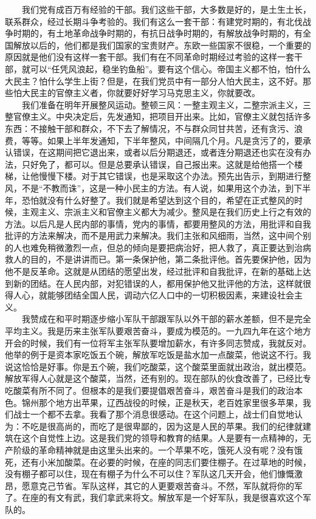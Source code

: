\documentclass[cn,11pt,chinese]{elegantbook}
\begin{document}
　　我们党有成百万有经验的干部。我们这些干部，大多数是好的，是土生土长，联系群众，经过长期斗争考验的。我们有这么一套干部：有建党时期的，有北伐战争时期的，有土地革命战争时期的，有抗日战争时期的，有解放战争时期的，有全国解放以后的，他们都是我们国家的宝贵财产。东欧一些国家不很稳，一个重要的原因就是他们没有这样一套干部。我们有在不同革命时期经过考验的这样一套干部，就可以“任凭风浪起，稳坐钓鱼船”。要有这个信心。帝国主义都不怕，怕什么大民主？怕什么学生上街？但是，在我们党员中有一部分人怕大民主，这不好。那些怕大民主的官僚主义者，你就要好好学习马克思主义，你就要改。\\
　　我们准备在明年开展整风运动。整顿三风：一整主观主义，二整宗派主义，三整官僚主义。中央决定后，先发通知，把项目开出来。比如，官僚主义就包括许多东西：不接触干部和群众，不下去了解情况，不与群众同甘共苦，还有贪污、浪费，等等。如果上半年发通知，下半年整风，中间隔几个月。凡是贪污了的，要承认错误，在这期间把它退出来，或者以后分期退还，或者连分期退还也实在没有办法，只好免了，都可以。但是总要承认错误，自己报出来。这就是给他搭一个楼梯，让他慢慢下楼。对于其它错误，也是采取这个办法。预先出告示，到期进行整风，不是“不教而诛”，这是一种小民主的方法。有人说，如果用这个办法，到下半年，恐怕就没有什么好整了。我们就是希望达到这个目的，希望在正式整风的时候，主观主义、宗派主义和官僚主义都大为减少。整风是在我们历史上行之有效的方法。以后凡是人民内部的事情，党内的事情，都要用整风的方法，用批评和自我批评的方法来解决，而不是用武力来解决。我们主张和风细雨，当然，这中间个别的人也难免稍微激烈一点，但总的倾向是要把病治好，把人救了，真正要达到治病救人的目的，不是讲讲而已。第一条保护他，第二条批评他。首先要保护他，因为他不是反革命。这就是从团结的愿望出发，经过批评和自我批评，在新的基础上达到新的团结。在人民内部，对犯错误的人，都用保护他又批评他的方法，这样就很得人心，就能够团结全国人民，调动六亿人口中的一切积极因素，来建设社会主义。\\
　　我赞成在和平时期逐步缩小军队干部跟军队以外干部的薪水差额，但不是完全平均主义。我是历来主张军队要艰苦奋斗，要成为模范的。一九四九年在这个地方开会的时候，我们有一位将军主张军队要增加薪水，有许多同志赞成，我就反对。他举的例于是资本家吃饭五个碗，解放军吃饭是盐水加一点酸菜，他说这不行。我说这恰恰是好事。你是五个碗，我们吃酸菜，这个酸菜里面就出政治，就出模范。解放军得人心就是这个酸菜，当然，还有别的。现在部队的伙食改善了，已经比专吃酸菜有所不同了。但根本的是我们要提倡艰苦奋斗，艰苦奋斗是我们的政治本色。锦州那个地方出苹果，辽西战役的时候，正是秋天，老百姓家里很多苹果，我们战士一个都不去拿。我看了那个消息很感动。在这个问题上，战士们自觉地认为：不吃是很高尚的，而吃了是很卑鄙的，因为这是人民的苹果。我们的纪律就建筑在这个自觉性上边。这是我们党的领导和教育的结果。人是要有一点精神的，无产阶级的革命精神就是由这里头出来的。一个苹果不吃，饿死人没有呢？没有饿死，还有小米加酸菜。在必要的时候，在座的同志们要住棚子。在过草地的时候，没有棚子都可以住，现在有棚子为什么不可以住？军队这几天开会，他们慷慨激昂，愿意克己节省。军队这样，其它的人更要艰苦奋斗。不然，军队就将你的军了。在座的有文有武，我们拿武来将文。解放军是一个好军队，我是很喜欢这个军队的。\\
\end{document}
